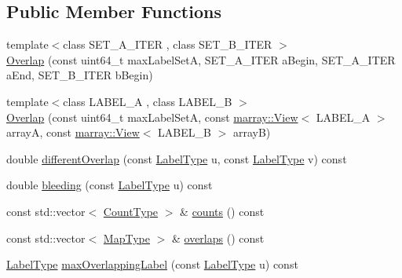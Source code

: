 \subsection*{Public Member Functions}
\begin{DoxyCompactItemize}
\item 
{\footnotesize template$<$class S\+E\+T\+\_\+\+A\+\_\+\+I\+T\+ER , class S\+E\+T\+\_\+\+B\+\_\+\+I\+T\+ER $>$ }\\\hyperlink{classnifty_1_1ground__truth_1_1Overlap_aedaa9af95b736f17f2dbfe0eff4c09bf}{Overlap} (const uint64\+\_\+t max\+Label\+SetA, S\+E\+T\+\_\+\+A\+\_\+\+I\+T\+ER a\+Begin, S\+E\+T\+\_\+\+A\+\_\+\+I\+T\+ER a\+End, S\+E\+T\+\_\+\+B\+\_\+\+I\+T\+ER b\+Begin)
\item 
{\footnotesize template$<$class L\+A\+B\+E\+L\+\_\+A , class L\+A\+B\+E\+L\+\_\+B $>$ }\\\hyperlink{classnifty_1_1ground__truth_1_1Overlap_a0a40f259581e8a4d9e594fd1db23170a}{Overlap} (const uint64\+\_\+t max\+Label\+SetA, const \hyperlink{classandres_1_1View}{marray\+::\+View}$<$ L\+A\+B\+E\+L\+\_\+A $>$ arrayA, const \hyperlink{classandres_1_1View}{marray\+::\+View}$<$ L\+A\+B\+E\+L\+\_\+B $>$ arrayB)
\item 
double \hyperlink{classnifty_1_1ground__truth_1_1Overlap_a0ccece6df11663b9b4d164d4e9148394}{different\+Overlap} (const \hyperlink{classnifty_1_1ground__truth_1_1Overlap_af14b9a872d3736d3115231866bc71612}{Label\+Type} u, const \hyperlink{classnifty_1_1ground__truth_1_1Overlap_af14b9a872d3736d3115231866bc71612}{Label\+Type} v) const
\item 
double \hyperlink{classnifty_1_1ground__truth_1_1Overlap_a52455f7a1bd85ae46dfd213ee397ceed}{bleeding} (const \hyperlink{classnifty_1_1ground__truth_1_1Overlap_af14b9a872d3736d3115231866bc71612}{Label\+Type} u) const
\item 
const std\+::vector$<$ \hyperlink{classnifty_1_1ground__truth_1_1Overlap_ab8f82b8fef890dc3d7b69da0cc768c76}{Count\+Type} $>$ \& \hyperlink{classnifty_1_1ground__truth_1_1Overlap_a2025a2a68d34653179b7c514bd29782b}{counts} () const
\item 
const std\+::vector$<$ \hyperlink{classnifty_1_1ground__truth_1_1Overlap_a6866ee8c988dd21d3fbd6ee5c2e836bf}{Map\+Type} $>$ \& \hyperlink{classnifty_1_1ground__truth_1_1Overlap_a70757f604cd152438eea764a7826df68}{overlaps} () const
\item 
\hyperlink{classnifty_1_1ground__truth_1_1Overlap_af14b9a872d3736d3115231866bc71612}{Label\+Type} \hyperlink{classnifty_1_1ground__truth_1_1Overlap_a440eef37dca6e71f84b8b855acf245c8}{max\+Overlapping\+Label} (const \hyperlink{classnifty_1_1ground__truth_1_1Overlap_af14b9a872d3736d3115231866bc71612}{Label\+Type} u) const

\end{DoxyCompactItemize}
